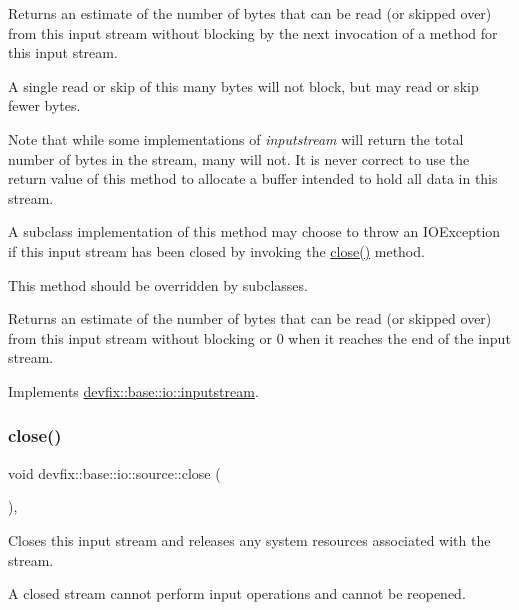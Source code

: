 Returns an estimate of the number of bytes that can be read (or skipped over) from this input stream without blocking by the next invocation of a method for this input stream. 

A single read or skip of this many bytes will not block, but may read or skip fewer bytes.

Note that while some implementations of {\itshape inputstream} will return the total number of bytes in the stream, many will not. It is never correct to use the return value of this method to allocate a buffer intended to hold all data in this stream.

A subclass\textquotesingle{} implementation of this method may choose to throw an I\+O\+Exception if this input stream has been closed by invoking the \hyperlink{structdevfix_1_1base_1_1io_1_1source_aa00a381c8a166cbbc5dbf6de4b56590e}{close()} method.

This method should be overridden by subclasses.

\begin{DoxyReturn}{Returns}
an estimate of the number of bytes that can be read (or skipped over) from this input stream without blocking or 0 when it reaches the end of the input stream. 
\end{DoxyReturn}


Implements \hyperlink{structdevfix_1_1base_1_1io_1_1inputstream_ace04813af676b6c81fa452eb4d81a796}{devfix\+::base\+::io\+::inputstream}.

\mbox{\label{structdevfix_1_1base_1_1io_1_1source_aa00a381c8a166cbbc5dbf6de4b56590e}} 
\subsubsection{\texorpdfstring{close()}{close()}}
{\footnotesize\ttfamily void devfix\+::base\+::io\+::source\+::close (\begin{DoxyParamCaption}{ }\end{DoxyParamCaption})\hspace{0.3cm}{\ttfamily [override]}, {\ttfamily [virtual]}}



Closes this input stream and releases any system resources associated with the stream. 

A closed stream cannot perform input operations and cannot be reopened. 


